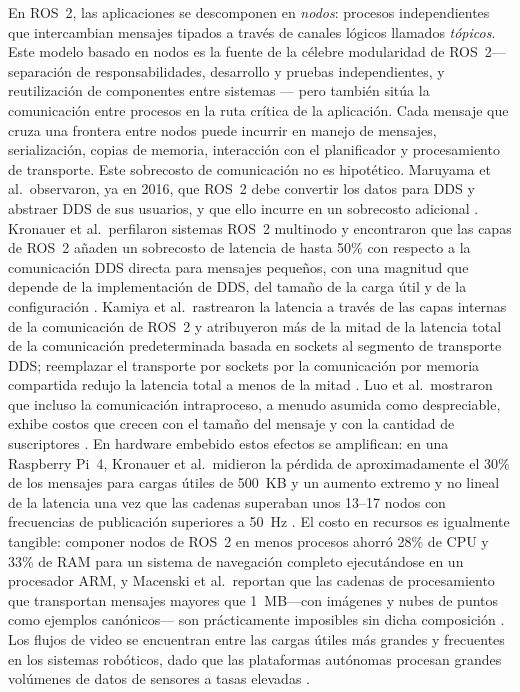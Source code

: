 En ROS~2, las aplicaciones se descomponen en \emph{nodos}: procesos
independientes que intercambian mensajes tipados a través de canales lógicos
llamados \emph{tópicos}. Este modelo basado en nodos es la fuente de la
célebre modularidad de ROS~2---separación de responsabilidades, desarrollo y
pruebas independientes, y reutilización de componentes entre sistemas
\cite{macenski2022}--- pero también sitúa la comunicación entre procesos en
la ruta crítica de la aplicación. Cada mensaje que cruza una frontera entre
nodos puede incurrir en manejo de mensajes, serialización, copias de
memoria, interacción con el planificador y procesamiento de transporte.
Este sobrecosto de comunicación no es hipotético. Maruyama et al.\
observaron, ya en 2016, que ROS~2 debe convertir los datos para DDS y
abstraer DDS de sus usuarios, y que ello incurre en un sobrecosto adicional
\cite{maruyama2016}. Kronauer et al.\ perfilaron sistemas ROS~2 multinodo y
encontraron que las capas de ROS~2 añaden un sobrecosto de latencia de
hasta 50\% con respecto a la comunicación DDS directa para mensajes
pequeños, con una magnitud que depende de la implementación de DDS, del
tamaño de la carga útil y de la configuración \cite{kronauer2021}. Kamiya
et al.\ rastrearon la latencia a través de las capas internas de la
comunicación de ROS~2 y atribuyeron más de la mitad de la latencia total de
la comunicación predeterminada basada en sockets al segmento de transporte
DDS; reemplazar el transporte por sockets por la comunicación por memoria
compartida redujo la latencia total a menos de la mitad \cite{kamiya2025}.
Luo et al.\ mostraron que incluso la comunicación intraproceso, a menudo
asumida como despreciable, exhibe costos que crecen con el tamaño del
mensaje y con la cantidad de suscriptores \cite{luo2025}. En hardware
embebido estos efectos se amplifican: en una Raspberry Pi~4, Kronauer et al.\
midieron la pérdida de aproximadamente el 30\% de los mensajes para cargas
útiles de 500~KB y un aumento extremo y no lineal de la latencia una vez que
las cadenas superaban unos 13--17 nodos con frecuencias de publicación
superiores a 50~Hz \cite{kronauer2021}. El costo en recursos es igualmente
tangible: componer nodos de ROS~2 en menos procesos ahorró 28\% de CPU y
33\% de RAM para un sistema de navegación completo ejecutándose en un
procesador ARM, y Macenski et al.\ reportan que las cadenas de procesamiento
que transportan mensajes mayores que 1~MB---con imágenes y nubes de puntos
como ejemplos canónicos--- son prácticamente imposibles sin dicha
composición \cite{macenski2023}. Los flujos de video se encuentran entre las
cargas útiles más grandes y frecuentes en los sistemas robóticos, dado que
las plataformas autónomas procesan grandes volúmenes de datos de sensores a
tasas elevadas \cite{kamiya2025}.

